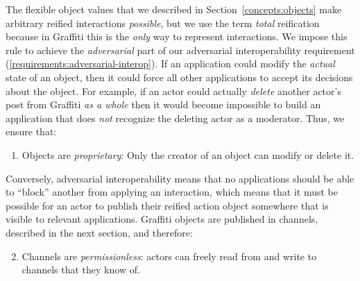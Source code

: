 

The flexible object values that we described in Section~\ref{concepts:objects} make arbitrary reified interactions \emph{possible}, but we use the term \emph{total} reification because in Graffiti this is the \emph{only} way to represent interactions.
We impose this rule to achieve the \emph{adversarial} part of our adversarial interoperability requirement (\ref{requirements:adversarial-interop}).
If an application could modify the \emph{actual} state of an object, then it could force all other applications to accept its decisions about the object.
For example, if an actor could actually \emph{delete} another actor's post
from Graffiti \emph{as a whole}
then it would become impossible to build
an application that does \emph{not} recognize the deleting actor as a moderator.
Thus, we ensure that:
\begin{enumerate}
\item
Objects are \emph{proprietary}: Only the creator of an object can modify or delete it.
\end{enumerate}
Conversely, adversarial interoperability means that no applications should be able to ``block'' another from applying an interaction, which means that it must be possible for an actor to publish
their reified action object somewhere that is visible
to relevant applications.
Graffiti objects are published in channels, described in the next
section, and therefore:
\begin{enumerate}
\setcounter{enumi}{1}
\item
Channels are \emph{permissionless}: actors can freely read from and write to channels that they know of.
\end{enumerate}

